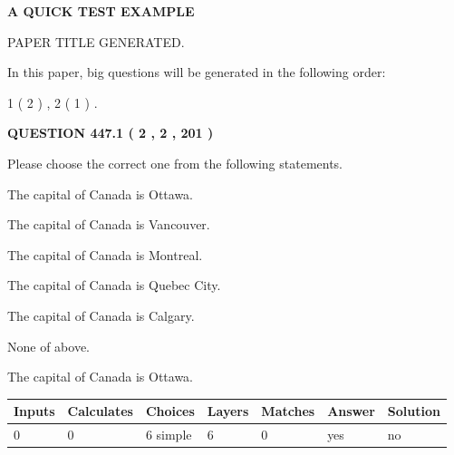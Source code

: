 \documentclass[12pt]{article}
\begin{document}
   
 \vspace{0.2in}
{\LARGE {\textbf{ A QUICK TEST EXAMPLE}}}
   
   
 PAPER TITLE GENERATED.
   
   
   
\vspace{0.2in}
   
In this paper, big questions will be generated in the following order: 
   
   
   1 ( 2 )
 ,
   2 ( 1 )
 .
  
\vspace{0.2in}
  
{\textbf{\Large{QUESTION
447.1 
 ( 2 , 2 , 201 )
}}}
  
  
Please choose the correct one from the following statements.
 
 
The capital of Canada is Ottawa.
 
 
The capital of Canada is Vancouver.
 
 
The capital of Canada is Montreal.
 
 
The capital of Canada is Quebec City.
 
 
The capital of Canada is Calgary.
 
 
 None of above.
 
 
\noindent{}
 
 
The capital of Canada is Ottawa.
 
 
\noindent{}
 
 
   
   
   
   
\noindent\begin{tabular}{|l|l|l|l|l|l|l|}
 \hline
Inputs & Calculates & Choices & Layers & Matches & Answer & Solution \\ \hline
 0  & 
 0  & 
 6
  simple  
  & 
 6  & 
 0  & 
  yes & 
  no 
  \\ \hline
 \end{tabular}
   
   
   
   
\noindent{}
   
\end{document}
